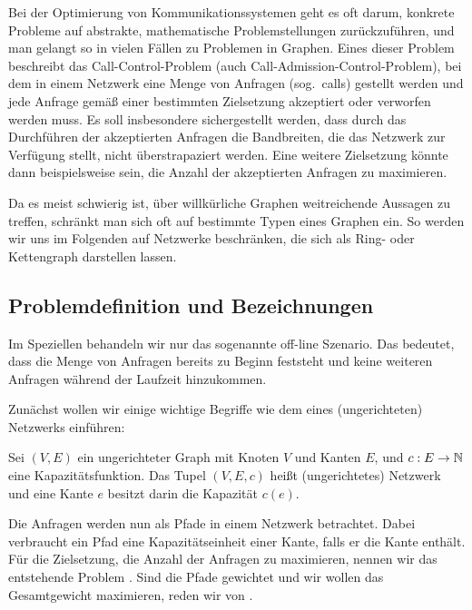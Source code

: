 Bei der Optimierung von Kommunikationssystemen geht es oft darum, konkrete Probleme auf abstrakte, mathematische 
Problemstellungen zurückzuführen, und man gelangt so in vielen Fällen zu Problemen in Graphen.
Eines dieser Problem beschreibt das Call-Control-Problem (auch Call-Admission-Control-Problem), bei dem
in einem Netzwerk eine Menge von Anfragen (sog.\ calls) gestellt werden und jede Anfrage gemäß einer bestimmten Zielsetzung
akzeptiert oder verworfen werden muss.
Es soll insbesondere sichergestellt werden, dass durch das Durchführen der akzeptierten Anfragen die Bandbreiten,
die das Netzwerk zur Verfügung stellt, nicht überstrapaziert werden.
Eine weitere Zielsetzung könnte dann beispielsweise sein, die Anzahl der akzeptierten Anfragen zu maximieren.

Da es meist schwierig ist, über willkürliche Graphen weitreichende Aussagen zu treffen, schränkt
man sich oft auf bestimmte Typen eines Graphen ein.
So werden wir uns im Folgenden auf Netzwerke beschränken, die sich als Ring- oder Kettengraph darstellen lassen.

\subsection{Problemdefinition und Bezeichnungen}
Im Speziellen behandeln wir nur das sogenannte off-line Szenario.
Das bedeutet, dass die Menge von Anfragen bereits zu Beginn feststeht und keine weiteren Anfragen während der
Laufzeit hinzukommen.

Zunächst wollen wir einige wichtige Begriffe wie dem eines (ungerichteten) Netzwerks einführen:

\begin{definition}[Netzwerk]
	Sei $(V,E)$ ein ungerichteter Graph mit Knoten $V$ und Kanten $E$, und $c: E \to \mathbb N$ eine Kapazitätsfunktion.
	Das Tupel $(V,E,c)$ heißt (ungerichtetes) Netzwerk und eine Kante $e$ besitzt darin die Kapazität $c(e)$.
\end{definition}

Die Anfragen werden nun als Pfade in einem Netzwerk betrachtet.
Dabei verbraucht ein Pfad eine Kapazitätseinheit einer Kante, falls er die Kante enthält.
Für die Zielsetzung, die Anzahl der Anfragen zu maximieren, nennen wir das entstehende Problem \CallControl.
Sind die Pfade gewichtet und wir wollen das Gesamtgewicht maximieren, reden wir von \WeightedCallControl.

